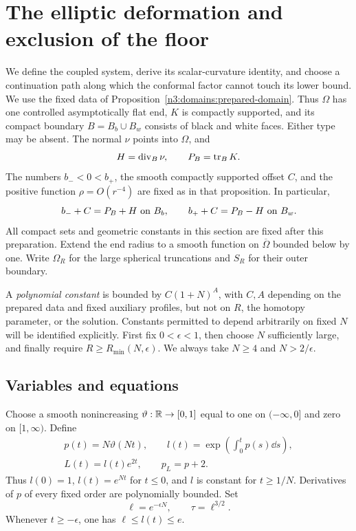 \section{The elliptic deformation and exclusion of the floor}
\label{n3:deformation:section}

We define the coupled system, derive its scalar-curvature identity, and
choose a continuation path along which the conformal factor cannot touch
its lower bound.  We use the fixed data of
Proposition~\ref{n3:domains:prepared-domain}. Thus $\Omega$ has one controlled
asymptotically flat end, $K$ is compactly supported, and its compact boundary
$B=B_b\cup B_w$ consists of black and white faces. Either type may be absent.
The normal $\nu$ points into $\Omega$, and
\[
 H=\operatorname{div}_B\nu,\qquad P_B=\operatorname{tr}_BK.
\]
The numbers $b_-<0<b_+$, the smooth compactly supported offset $C$, and
the positive function $\rho=O(r^{-4})$ are fixed as in that proposition.
In particular,
\begin{equation}\label{n3:deformation:face-thresholds}
 b_-+C=P_B+H\ \hbox{on }B_b,\qquad
 b_++C=P_B-H\ \hbox{on }B_w.
\end{equation}
All compact sets and geometric constants in this section are fixed after
this preparation. Extend the end radius to a smooth function on
$\overline\Omega$ bounded below by one. Write $\Omega_R$ for the large
spherical truncations and $S_R$ for their outer boundary.

A \emph{polynomial constant} is bounded by $C(1+N)^A$, with $C,A$
depending on the prepared data and fixed auxiliary profiles, but not on
$R$, the homotopy parameter, or the solution. Constants permitted to
depend arbitrarily on fixed $N$ will be identified explicitly.
First fix $0<\epsilon<1$, then choose $N$ sufficiently large, and finally
require $R\ge R_{\min}(N,\epsilon)$. We always take $N\ge4$ and
$N>2/\epsilon$.

\subsection{Variables and equations}
\label{n3:deformation:variables}

Choose a smooth nonincreasing $\vartheta:\mathbb R\to[0,1]$ equal to one on
$(-\infty,0]$ and zero on $[1,\infty)$. Define
\begin{equation}\label{n3:deformation:l-profile}
 \begin{gathered}
 p(t)=N\vartheta(Nt),\qquad
 l(t)=\exp\left(\int_0^t p(s)\dd s\right),\\
 L(t)=l(t)e^{2t},\qquad p_L=p+2.
 \end{gathered}
\end{equation}
Thus $l(0)=1$, $l(t)=e^{Nt}$ for $t\le0$, and $l$ is constant for
$t\ge1/N$. Derivatives of $p$ of every fixed order are polynomially bounded.
Set
\begin{equation}\label{n3:deformation:small-parameters}
 \ell=e^{-\epsilon N},\qquad \tau=\ell^{3/2}.
\end{equation}
Whenever $t\ge-\epsilon$, one has $\ell\le l(t)\le e$.

